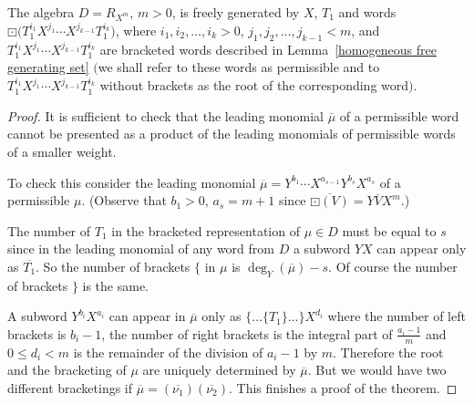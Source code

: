 \begin{Theorem}The algebra $D = R_{X^m}$, $m > 0$, is freely generated by $X$, $T_1$ and words $\boxdot\big(T_1^{i_1}X^{j_1} \cdots \allowbreak X^{j_{k-1}}T_1^{i_k}\big)$, where $i_1, i_2, \ldots,i_k > 0$, $j_1, j_2, \ldots, j_{k-1} < m$, and $T_1^{i_1}X^{j_1} \cdots X^{j_{k-1}}T_1^{i_k}$ are bracketed words described in Lemma~{\rm \ref{homogeneous free generating set}} $($we shall refer to these words as permissible and to $T_1^{i_1}X^{j_1} \cdots X^{j_{k-1}}T_1^{i_k}$ without brackets as the root of the corresponding word$)$.
\end{Theorem}

\begin{proof}It is sufficient to check that the leading monomial $\overline{\mu}$ of a permissible word cannot be presented as a product of the leading monomials of permissible words of a smaller weight.

To check this consider the leading monomial $\overline{\mu} = Y^{b_1} \cdots X^{a_{s-1}}Y^{b_s}X^{a_s}$ of a permissible $\mu$. (Observe that $b_1 > 0$, $a_s = m+1$ since $\overline{\boxdot(V)} =Y\overline{V}X^m$.)

The number of $T_1$ in the bracketed representation of $\mu \in D$ must be equal to $s$ since in the leading monomial of any word from $D$ a subword $YX$ can appear only as $\overline{T_1}$. So the number of brackets $\{$ in $\mu$ is $\deg_Y(\overline{\mu}) - s$. Of course the number of brackets $\}$ is the same.

A subword $Y^{b_i}X^{a_i}$ can appear in $\overline{\mu}$ only as $\{\ldots\{T_1\}\ldots\}X^{d_i}$ where the number of left brackets is $b_i - 1$, the number of right brackets is the integral part of $\frac{a_i - 1}{m}$ and $0 \leq d_i <m$ is the remainder of the division of $a_i - 1$ by $m$. Therefore the root and the bracketing of $\mu$ are uniquely determined by $\overline{\mu}$. But we would have two different bracketings if $\overline{\mu} = (\overline{\nu_1})(\overline{\nu_2})$. This finishes a proof of the theorem.
\end{proof}
